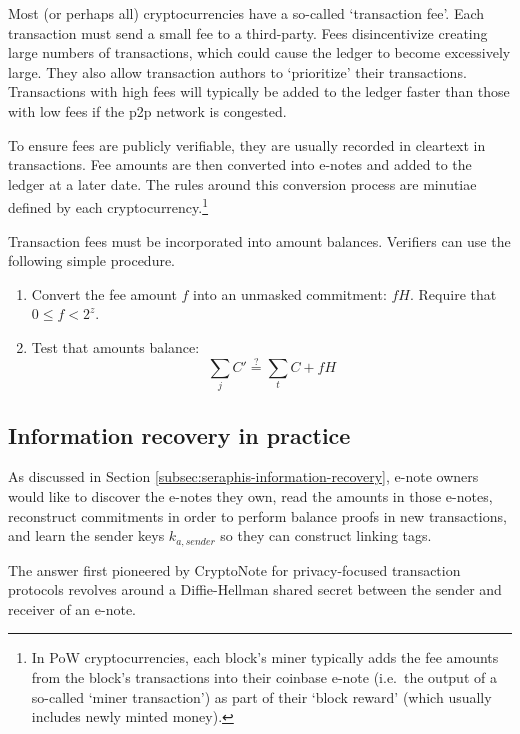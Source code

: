Most (or perhaps all) cryptocurrencies have a so-called `transaction fee'. Each transaction must send a small fee to a third-party. Fees disincentivize creating large numbers of transactions, which could cause the ledger to become excessively large. They also allow transaction authors to `prioritize' their transactions. Transactions with high fees will typically be added to the ledger faster than those with low fees if the p2p network is congested.

To ensure fees are publicly verifiable, they are usually recorded in cleartext in transactions. Fee amounts are then converted into e-notes and added to the ledger at a later date. The rules around this conversion process are minutiae defined by each cryptocurrency.\footnote{In PoW cryptocurrencies, each block's miner typically adds the fee amounts from the block's transactions into their coinbase e-note (i.e.\ the output of a so-called `miner transaction') as part of their `block reward' (which usually includes newly minted money).}

Transaction fees must be incorporated into amount balances. Verifiers can use the following simple procedure.

\begin{enumerate}
    \item Convert the fee amount $f$ into an unmasked commitment: $f H$. Require that $0 \leq f < 2^z$.
    \item Test that amounts balance:
    \[\sum_j C' \stackrel{?}{=} \sum_t C + f H\]
\end{enumerate}


\subsection{Information recovery in practice}
\label{subsec:implementers-information-recovery}

As discussed in Section \ref{subsec:seraphis-information-recovery}, e-note owners would like to discover the e-notes they own, read the amounts in those e-notes, reconstruct commitments in order to perform balance proofs in new transactions, and learn the sender keys $k_{a,sender}$ so they can construct linking tags.

The answer first pioneered by CryptoNote \cite{cryptoNoteWhitePaper} for privacy-focused transaction protocols revolves around a Diffie-Hellman shared secret between the sender and receiver of an e-note.

